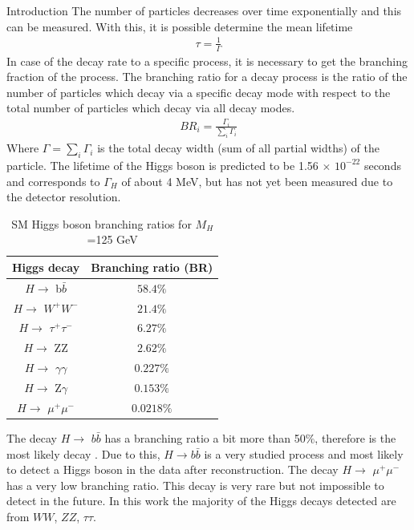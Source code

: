\begin{chapter}{Introduction}
The number of particles decreases over time exponentially and this can be measured. With this, it is possible determine the mean lifetime\cite{griff}
\begin{align}
\tau=\frac{1}{\Gamma}
\end{align}
In case of the decay rate to a specific process, it is necessary to get the branching fraction of the process. 
The branching ratio for a decay process is the ratio of the number of particles which decay via a specific decay mode with respect to the total number of particles which decay via all decay modes.
\begin{align}
BR_i =\frac{\Gamma_i}{\sum_{i}\Gamma_i}
\end{align}
Where $\Gamma=\sum_i\Gamma_i$ is the total decay width (sum of all partial widths) of the particle.
The lifetime of the Higgs boson is predicted to be 1.56 $\times$ $10^{-22}$ seconds and corresponds to $\Gamma_H$ of about 4 MeV, but has not yet been measured due to the detector resolution\cite{cms-manual}.

\begin{table}[ht] 
\caption[SM Higgs boson branching ratios for $M_H$ =125 GeV]{SM Higgs boson branching ratios for $M_H$ =125 GeV \protect \cite{pd}}
\centering
\begin{tabular}{|c|c|}
\hline
Higgs decay & Branching ratio (BR)\\
\hline
$H \rightarrow$ b$\bar{b}$ &$58.4\%$ \\
\hline
 $H \rightarrow$ $W^+W^-$ &$21.4\%$ \\
\hline
$H \rightarrow$ $\tau^+ \tau^-$ & $6.27\%$\\
\hline
$H \rightarrow$ ZZ &$2.62\%$\\
\hline
$H \rightarrow$ $\gamma\gamma$ &$0.227\%$\\
\hline
$H \rightarrow$ Z$\gamma$ &$0.153\%$\\
\hline
$H \rightarrow$ $\mu^+\mu^-$ &$0.0218\%$\\
\hline
\end{tabular}
\label{higgs1}
\end{table}
The decay $H \rightarrow$ $b\bar{b}$ has a branching ratio a bit more than 50$\%$, therefore is the most likely decay . Due to this, $H\rightarrow b\bar{b}$ is a very studied process and most likely to detect a Higgs boson in the data after reconstruction. The decay $H \rightarrow$ $\mu^+\mu^-$ has a very low branching ratio. This decay is very rare but not impossible to detect in the future. In this work the majority of the Higgs decays detected are from $WW$, $ZZ$, $\tau \tau$.


\end{chapter}
